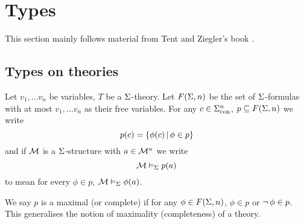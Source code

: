 \section{Types}
This section mainly follows material from Tent and Ziegler's book \cite{tent}.
\subsection{Types on theories}
\begin{dfn}
    Let ${v_1,\dots v_n}$ be variables,
    $T$ be a $\Sigma$-theory.
    Let $F(\Sigma,n)$ be the set of $\Sigma$-formulas with at most 
    $v_1,\dots v_n$ as their free variables.
    For any $c \in {\Sigma}_\mathrm{con}^n$, $p \subseteq F(\Sigma,n)$
    we write 
    \[p(c) = \left\{\phi(c) \,|\, \phi \in p\right\}\]
    and if $\mathcal{M}$ is a $\Sigma$-structure with $a \in {\mathcal{M}}^n$ we write 
    \[\mathcal{M} \vDash_{\Sigma} p(a)\]
    to mean for every $\phi \in p$, $\mathcal{M} \vDash_{\Sigma} \phi(a)$.

    We say $p$ is a maximal (or complete) if for any $\phi \in F(\Sigma,n)$,
    $\phi \in p$ or $\neg\, \phi \in p$.
    This generalises the notion of maximality (completeness) of a theory.
\end{dfn}

